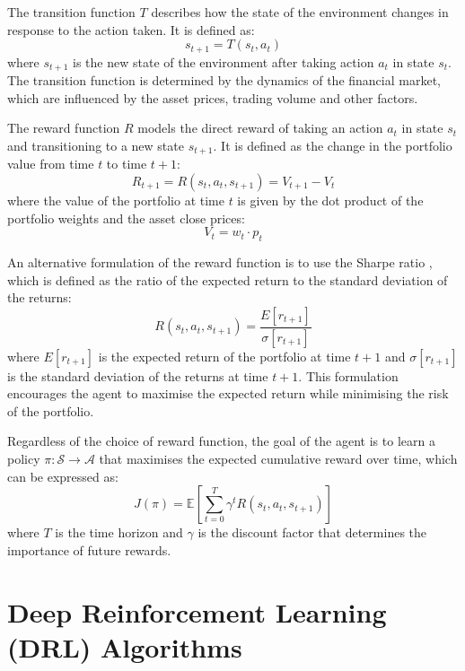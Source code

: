 The transition function $T$ describes how the state of the environment changes in response to the action taken. It is defined as:
\begin{equation}
    s_{t+1} = T(s_t, a_t)
\end{equation}
where $s_{t+1}$ is the new state of the environment after taking action $a_t$ in state $s_t$. The transition function is determined by the dynamics of the financial market, which are influenced by the asset prices, trading volume and other factors.

The reward function $R$ models the direct reward of taking an action $a_t$ in state $s_t$ and transitioning to a new state $s_{t+1}$. It is defined as the change in the portfolio value from time $t$ to time $t+1$:
\begin{equation}
    R_{t+1} = R(s_t, a_t, s_{t+1}) = V_{t+1} - V_t
\end{equation}
where the value of the portfolio at time $t$ is given by the dot product of the portfolio weights and the asset close prices:
\begin{equation}
    V_t = w_t \cdot p_t
\end{equation}

An alternative formulation of the reward function is to use the Sharpe ratio \cite{Sharpe1994}, which is defined as the ratio of the expected return to the standard deviation of the returns:
\begin{equation}
    R(s_t, a_t, s_{t+1}) = \frac{E[r_{t+1}]}{\sigma[r_{t+1}]}
\end{equation}
where $E[r_{t+1}]$ is the expected return of the portfolio at time $t+1$ and $\sigma[r_{t+1}]$ is the standard deviation of the returns at time $t+1$. This formulation encourages the agent to maximise the expected return while minimising the risk of the portfolio.

Regardless of the choice of reward function, the goal of the agent is to learn a policy $\pi: \mathcal{S} \to \mathcal{A}$ that maximises the expected cumulative reward over time, which can be expressed as:
\begin{equation}
    J(\pi) = \mathbb{E} \left[\sum_{t=0}^{T} \gamma^t R(s_t, a_t, s_{t+1}) \right]
\end{equation} 
where $T$ is the time horizon and $\gamma$ is the discount factor that determines the importance of future rewards. 

\section{Deep Reinforcement Learning (DRL) Algorithms} \label{sec:drl-algorithms}

